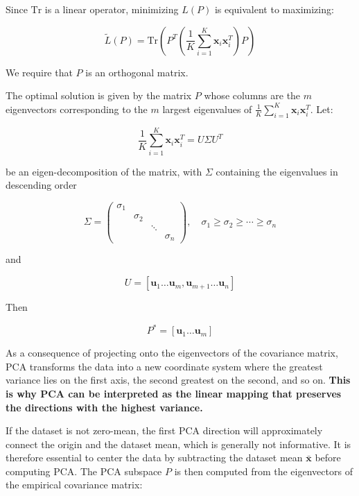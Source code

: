 Since $\text{Tr}$ is a linear operator, minimizing $L(P)$ is equivalent to maximizing:

\begin{equation*}
	\widetilde{L}(P) = \text{Tr}\left(P^T \left(\frac{1}{K}\sum_{i=1}^{K} \mathbf{x}_i\mathbf{x}_i^T\right) P\right)
\end{equation*}

We require that $P$ is an orthogonal matrix.

The optimal solution is given by the matrix $P$ whose columns are the $m$ eigenvectors corresponding to the $m$ largest eigenvalues of $\frac{1}{K}\sum_{i=1}^{K} \mathbf{x}_i\mathbf{x}_i^T$. Let:

\begin{equation*}
\frac{1}{K}\sum_{i=1}^{K} \mathbf{x}_i\mathbf{x}_i^T = U\Sigma U^T
\end{equation*}

be an eigen-decomposition of the matrix, with $\Sigma$ containing the eigenvalues in descending order

\begin{equation*}
\Sigma = \begin{pmatrix} \sigma_1 \\ & \sigma_2 \\ & & \ddots \\ & & & \sigma_n \end{pmatrix}, \quad \sigma_1 \geq \sigma_2 \geq \cdots \geq \sigma_n
\end{equation*}

and

\begin{equation*}
U = [\mathbf{u}_1 \ldots \mathbf{u}_m, \mathbf{u}_{m+1} \ldots \mathbf{u}_n]
\end{equation*}

Then

\begin{equation*}
P^* = [\mathbf{u}_1 \ldots \mathbf{u}_m]
\end{equation*}

As a consequence of projecting onto the eigenvectors of the covariance matrix, PCA transforms the data into a new coordinate system where the greatest variance lies on the first axis, the second greatest on the second, and so on. 
\textbf{This is why PCA can be interpreted as the linear mapping that preserves the directions with the highest variance.}

If the dataset is not zero-mean, the first PCA direction will approximately connect the origin and the dataset mean, which is generally not informative. It is therefore essential to center the data by subtracting the dataset mean $\bar{\mathbf{x}}$ before computing PCA. The PCA subspace $P$ is then computed from the eigenvectors of the empirical covariance matrix:

